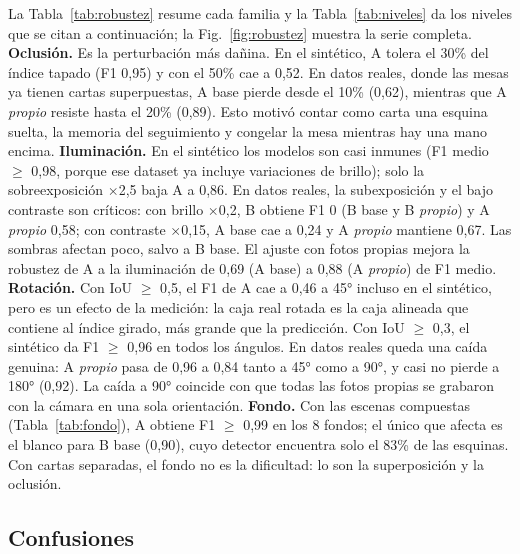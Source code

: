 \documentclass[conference,a4paper]{IEEEtran}
\begin{document}
La Tabla~\ref{tab:robustez} resume cada familia y la Tabla~\ref{tab:niveles} da los niveles que se citan a
continuación; la Fig.~\ref{fig:robustez} muestra la serie completa.
\textbf{Oclusión.} Es la perturbación más dañina. En el sintético, A tolera el 30\% del índice tapado (F1 0,95) y con
el 50\% cae a 0,52. En datos reales, donde las mesas ya tienen cartas superpuestas, A base pierde desde el
10\% (0,62), mientras que A \emph{propio} resiste hasta el 20\% (0,89). Esto motivó contar como carta una esquina suelta,
la memoria del seguimiento y congelar la mesa mientras hay una mano encima.
\textbf{Iluminación.} En el sintético los modelos son casi inmunes (F1 medio $\geq$ 0,98, porque ese dataset ya
incluye variaciones de brillo); solo la sobreexposición $\times$2,5 baja A a 0,86. En datos reales, la subexposición
y el bajo contraste son críticos: con brillo $\times$0,2, B obtiene F1 0 (B base y B \emph{propio}) y A \emph{propio}
0,58; con contraste $\times$0,15, A base cae a 0,24 y A \emph{propio} mantiene 0,67. Las sombras afectan poco, salvo
a B base. El ajuste con fotos propias mejora la robustez de A a la iluminación de 0,69 (A base) a 0,88
(A \emph{propio}) de F1 medio.
\textbf{Rotación.} Con IoU $\geq$ 0,5, el F1 de A cae a 0,46 a 45° incluso en el sintético, pero es un efecto de la
medición: la caja real rotada es la caja alineada que contiene al índice girado, más grande que la predicción. Con
IoU $\geq$ 0,3, el sintético da F1 $\geq$ 0,96 en todos los ángulos. En datos reales queda una caída genuina: A
\emph{propio} pasa de 0,96 a 0,84 tanto a 45° como a 90°, y casi no pierde a 180° (0,92). La caída a 90° coincide con que
todas las fotos propias se grabaron con la cámara en una sola orientación.
\textbf{Fondo.} Con las escenas compuestas (Tabla~\ref{tab:fondo}), A obtiene F1 $\geq$ 0,99 en los 8 fondos; el
único que afecta es el blanco para B base (0,90), cuyo detector encuentra solo el 83\% de las esquinas. Con cartas
separadas, el fondo no es la dificultad: lo son la superposición y la oclusión.

\subsection{Confusiones}
\end{document}
